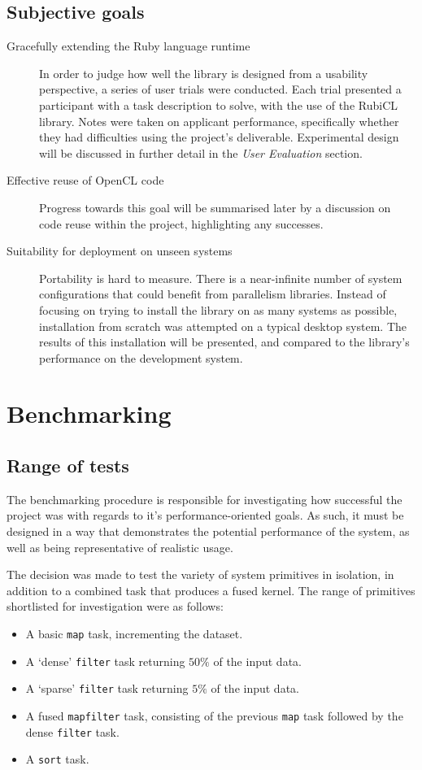 \subsection{Subjective goals}
\begin{description}
\item[Gracefully extending the Ruby language runtime]
In order to judge how well the library is designed from a usability perspective, a series of user trials were conducted.
Each trial presented a participant with a task description to solve, with the use of the RubiCL library.
Notes were taken on applicant performance, specifically whether they had difficulties using the project's deliverable.
Experimental design will be discussed in further detail in the \emph{User Evaluation} section.
\item[Effective reuse of \ac{OpenCL} code]
Progress towards this goal will be summarised later  by a discussion on code reuse within the project, highlighting any successes. 
\item[Suitability for deployment on unseen systems]
Portability is hard to measure. There is a near-infinite number of system configurations that could benefit from parallelism libraries. Instead of focusing on trying to install the library on as many systems as possible, installation from scratch was attempted on a typical desktop system. The results of this installation will be presented, and compared to the library's performance on the development system.
\end{description}

\section{Benchmarking}
\subsection{Range of tests}
The benchmarking procedure is responsible for investigating how successful the project was with regards to it's performance-oriented goals.
As such, it must be designed in a way that demonstrates the potential performance of the system, as well as being representative of realistic usage.

The decision was made to test the variety of system primitives in isolation, in addition to a combined task that produces a fused kernel.
The range of primitives shortlisted for investigation were as follows:
\begin{itemize}
  \item A basic \verb|map| task, incrementing the dataset.
  \item A `dense' \verb|filter| task returning $50\%$ of the input data.
  \item A `sparse' \verb|filter| task returning $5\%$ of the input data.
  \item A fused \verb|mapfilter| task, consisting of the previous \verb|map| task followed by the dense \verb|filter| task.
  \item A \verb|sort| task.
\end{itemize}

